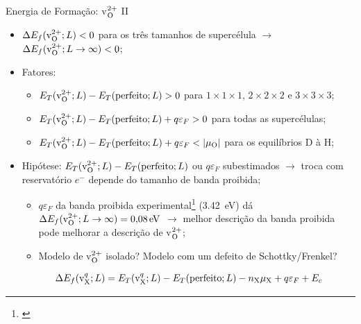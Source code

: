 \begin{frame}{Energia de Formação: \texorpdfstring{v$_{\ce{O}}^{2+}$}{vO2+} II}
	\begin{itemize}
		\item $\Delta E_f (\text{v}_{\ce{O}}^{2+}; L) < 0$ para os três tamanhos de supercélula $\to$ $\Delta E_f (\text{v}_{\ce{O}}^{2+}; L \to \infty) < 0$;
		\item Fatores:
		\begin{itemize}
			\item $E_T (\text{v}_{\ce{O}}^{2+}; L) - E_T (\text{perfeito}; L) > 0$ para $1\times1\times1$, $2\times2\times2$ e $3\times3\times3$;
			\item $E_T (\text{v}_{\ce{O}}^{2+}; L) - E_T (\text{perfeito}; L) + q \varepsilon_F > 0$ para todas as supercélulas;
			\item $E_T (\text{v}_{\ce{O}}^{2+}; L) - E_T (\text{perfeito}; L) + q \varepsilon_F < | \mu_{\ce{O}} |$ para os equilíbrios D à H;
		\end{itemize}
		\item Hipótese: $E_T (\text{v}_{\ce{O}}^{2+}; L) - E_T (\text{perfeito}; L)$ ou $ q \varepsilon_F$ subestimados $\to$ troca com reservatório $e^{-}$ depende do tamanho de banda proibida;
		\begin{itemize}
			\item $q \varepsilon_F$ da banda proibida experimental\footnote[frame]{\cite{li_constructing_2014}} (\SI{3.42}{\electronvolt}) dá $\Delta E_f (\text{v}_{\ce{O}}^{2+}; L \to \infty) = \SI{0.08}{\electronvolt}$ $\to$ melhor descrição da banda proibida pode melhorar a descrição de v$_{\ce{O}}^{2+}$;
			\item Modelo de v$_{\ce{O}}^{2+}$ isolado? Modelo com um defeito de Schottky/Frenkel?
		\end{itemize}\vfill
		\begin{equation*}
			\Delta E_f (\text{v}_{\ce{X}}^{q}; L) = E_T (\text{v}_{\ce{X}}^{q}; L) - E_T (\text{perfeito}; L) - n_{\ce{X}} \mu_{\ce{X}} + q \varepsilon_F + E_c
		\end{equation*}
	\end{itemize}
\end{frame}

